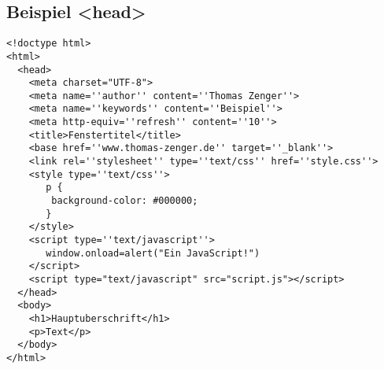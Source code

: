 \subsection{Beispiel <head>}
\begin{lstlisting}[caption=''<head> Beispiel'']
<!doctype html>
<html>
  <head>
    <meta charset="UTF-8">
    <meta name=''author'' content=''Thomas Zenger''>
    <meta name=''keywords'' content=''Beispiel''>
    <meta http-equiv=''refresh'' content=''10''>
    <title>Fenstertitel</title>
    <base href=''www.thomas-zenger.de'' target=''_blank''>
    <link rel=''stylesheet'' type=''text/css'' href=''style.css''>
    <style type=''text/css''>
       p {
        background-color: #000000;
       }
    </style>
    <script type=''text/javascript''>
       window.onload=alert("Ein JavaScript!")
    </script>
    <script type="text/javascript" src="script.js"></script>
  </head>
  <body>
    <h1>Hauptuberschrift</h1>
    <p>Text</p>
  </body>
</html>
\end{lstlisting}
